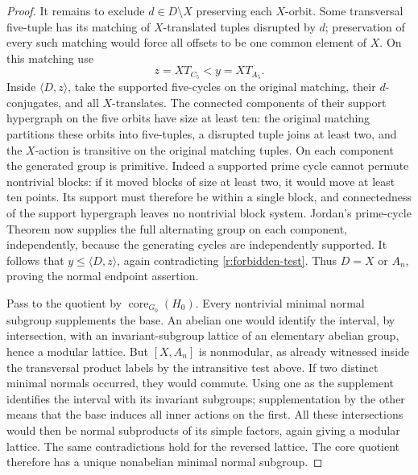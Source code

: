 \begin{proof}
It remains to exclude $d\in D\setminus X$ preserving each $X$-orbit.
Some transversal five-tuple has its matching of $X$-translated tuples
disrupted by $d$; preservation of every such matching would force all
offsets to be one common element of $X$.  On this matching use
\[
 z=XT_{C_5}<y=XT_{A_5}.
\]
Inside $\langle D,z\rangle$, take the supported five-cycles on the
original matching, their $d$-conjugates, and all $X$-translates.
The connected components of their support hypergraph on the five
orbits have size at least ten: the original matching partitions
these orbits into five-tuples, a disrupted tuple joins at least two,
and the $X$-action is transitive on the original matching tuples.
On each component the generated group is primitive.  Indeed a
supported prime cycle cannot permute nontrivial blocks: if it moved
blocks of size at least two, it would move at least ten points.  Its
support must therefore be within a single block, and connectedness
of the support hypergraph leaves no nontrivial block system.
Jordan's prime-cycle Theorem \citep[Theorem~1.1]{Jones2014} now supplies the full alternating group
on each component, independently, because the generating cycles
are independently supported.  It follows that
$y\le\langle D,z\rangle$, again contradicting
\eqref{r:forbidden-test}.  Thus $D=X$ or $A_n$, proving the normal
endpoint assertion.

Pass to the quotient by $\operatorname{core}_{G_0}(H_0)$.
Every nontrivial minimal normal subgroup supplements the base.
An abelian one would identify the interval, by intersection, with
an invariant-subgroup lattice of an elementary abelian group, hence
a modular lattice.  But $[X,A_n]$ is nonmodular, as already witnessed
inside the transversal product labels by the intransitive test above.
If two distinct minimal normals occurred, they would commute.  Using
one as the supplement identifies the interval with its invariant
subgroups; supplementation by the other means that the base induces
all inner actions on the first.  All these intersections would then
be normal subproducts of its simple factors, again giving a modular
lattice.  The same contradictions hold for the reversed lattice.
The core quotient therefore has a unique nonabelian minimal normal
subgroup.
\end{proof}

